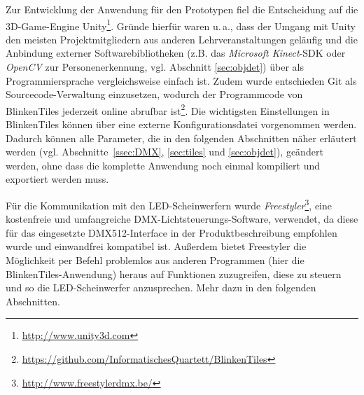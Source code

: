 \label{ssec:entscheidungen}

Zur Entwicklung der Anwendung für den Prototypen fiel die Entscheidung auf die 3D-Game-Engine Unity\footnote{\url{http://www.unity3d.com}}. Gründe hierfür waren u.\,a., dass der Umgang mit Unity den meisten Projektmitgliedern aus anderen Lehrveranstaltungen geläufig und die Anbindung externer Softwarebibliotheken (z.B. das \emph{Microsoft Kinect}-SDK oder \emph{OpenCV} zur Personenerkennung, vgl. Abschnitt \ref{sec:objdet}) über \CS{} als Programmiersprache vergleichsweise einfach ist. Zudem wurde entschieden Git als Sourcecode-Verwaltung einzusetzen, wodurch der Programmcode von BlinkenTiles jederzeit online abrufbar ist\footnote{\url{https://github.com/InformatischesQuartett/BlinkenTiles}}. Die wichtigsten Einstellungen in BlinkenTiles können über eine externe Konfigurationsdatei vorgenommen werden. Dadurch können alle Parameter, die in den folgenden Abschnitten näher erläutert werden (vgl. Abschnitte~\ref{ssec:DMX}, \ref{sec:tiles} und \ref{sec:objdet}), geändert werden, ohne dass die komplette Anwendung noch einmal kompiliert und exportiert werden muss.

Für die Kommunikation mit den LED-Scheinwerfern wurde \emph{Freestyler}\footnote{\url{http://www.freestylerdmx.be/}}, eine kostenfreie und umfangreiche DMX-Lichtsteuerungs-Software, verwendet, da diese für das eingesetzte DMX512-Interface in der Produktbeschreibung empfohlen wurde und einwandfrei kompatibel ist. Außerdem bietet Freestyler die Möglichkeit per Befehl problemlos aus anderen Programmen (hier die BlinkenTiles-Anwendung) heraus auf Funktionen zuzugreifen, diese zu steuern und so die LED-Scheinwerfer anzusprechen. Mehr dazu in den folgenden Abschnitten.

